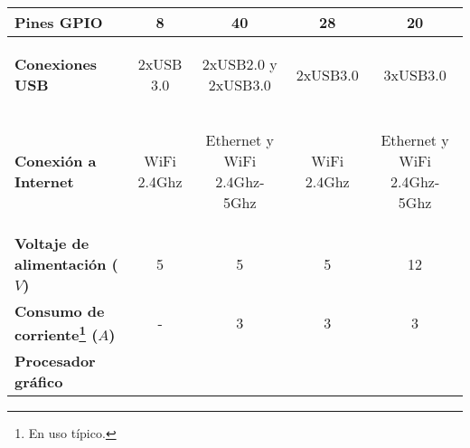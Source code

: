 \begin{savenotes}
\begin{mytable}[H]
\begin{tabular}{l|c|c|c|c|}
			\multicolumn{1}{|l|}{
				\begin{minipage}{\myforthmaxsizeofcontenttable}	
					\textbf{Pines GPIO}
				\end{minipage}
			} & 8 & 40 & 28 & 20 \\ \hline		
			\multicolumn{1}{|l|}{
				\begin{minipage}{\myforthmaxsizeofcontenttable}	
					\textbf{Conexiones USB}
				\end{minipage}
			} & 2xUSB 3.0 & 
			\begin{minipage}{\mythirdmaxsizeofcontenttable}\begin{myflushcenter}
					2xUSB2.0 y 2xUSB3.0
			\end{myflushcenter}\end{minipage}
		 	& 2xUSB3.0 & 3xUSB3.0 \\ \hline	
			\multicolumn{1}{|l|}{
				\begin{minipage}{\myforthmaxsizeofcontenttable}	
					\textbf{Conexión a Internet}
				\end{minipage}
			} & WiFi 2.4Ghz & 
			\begin{minipage}{\mythirdmaxsizeofcontenttable}\begin{myflushcenter}
				Ethernet y WiFi 2.4Ghz- 5Ghz
			\end{myflushcenter}\end{minipage}
			 & WiFi 2.4Ghz & 
			 \begin{minipage}{\mythirdmaxsizeofcontenttable}\begin{myflushcenter}
			 		Ethernet y WiFi 2.4Ghz- 5Ghz
			 \end{myflushcenter}\end{minipage} \\ \hline		
			\multicolumn{1}{|l|}{
				\begin{minipage}{\myforthmaxsizeofcontenttable}	
					\textbf{Voltaje de alimentación ($V$)}
				\end{minipage}
			} & 5 & 5 & 5 & 12 \\ \hline			
			\multicolumn{1}{|l|}{
				\begin{minipage}{\myforthmaxsizeofcontenttable}	
					\textbf{Consumo de corriente\footnote{En uso típico.} ($A$)}
				\end{minipage}
			} & - & 3 & 3 & 3 \\ \hline
			\multicolumn{1}{|l|}{
				\begin{minipage}{\myforthmaxsizeofcontenttable}	
					\textbf{Procesador gráfico}
				\end{minipage}
}
\end{tabular}
\end{mytable}
\end{savenotes}
